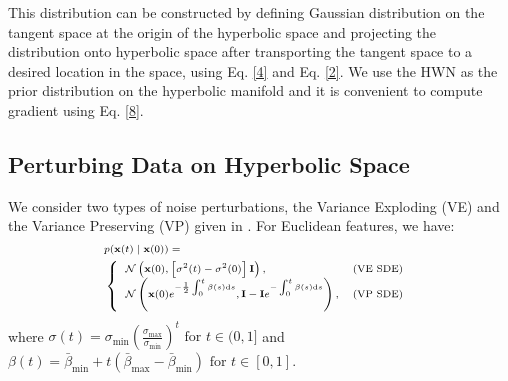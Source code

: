 \documentclass[letterpaper]{article} %
\begin{document}
This distribution can be constructed by defining Gaussian distribution on the tangent space at the origin of the hyperbolic space and projecting the distribution onto hyperbolic space after transporting the tangent space to a desired location in the space, using Eq. \eqref{4} and Eq. \eqref{2}. We use the HWN as the prior distribution on the hyperbolic manifold and it is convenient to compute gradient using Eq. \eqref{8}.

%
\subsection{Perturbing Data on Hyperbolic Space}
We consider two types of noise perturbations, the Variance Exploding (VE) and the Variance Preserving (VP) given in \cite{song2020score}. For Euclidean features, we have:
\begin{equation}\label{9}
\begin{scriptsize}{
\begin{aligned}
&p(\mathbf{x}(t) \mid \mathbf{x}(0))=\\ &\left\{\begin{array}{ll}
\mathcal{N}\left(\mathbf{x}(0),\left[\sigma^{2}(t)-\sigma^{2}(0)\right] \mathbf{I}\right), & \text {(VE SDE) } \\
\mathcal{N}\left(\mathbf{x}(0)e^{-\frac{1}{2} \int_{0}^{t} \beta(s) \mathrm{d} s} , \mathbf{I}-\mathbf{I} e^{-\int_{0}^{t} \beta(s) \mathrm{d} s}\right), & (\text{VP SDE)} \\
\end{array}\right.
\end{aligned}
}\end{scriptsize}
\end{equation}
%
where $\sigma(t)=\sigma_{\min }\left(\frac{\sigma_{\max }}{\sigma_{\min }}\right)^{t} \text { for } t \in(0,1]$ and $\beta(t)=\bar{\beta}_{\min }+t\left(\bar{\beta}_{\max }-\bar{\beta}_{\min }\right) \text { for } t \in[0,1]$.
\end{document}
